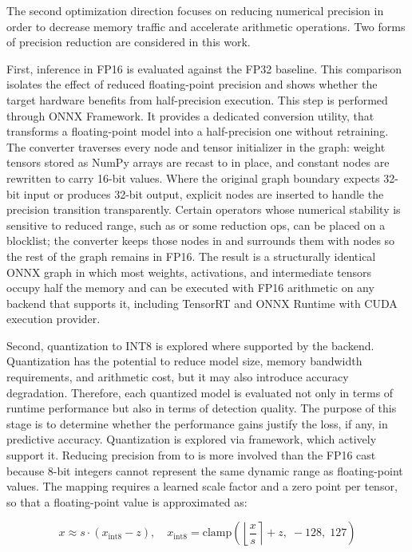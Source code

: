 \documentclass[12pt,a4paper]{report}
\begin{document}
The second optimization direction focuses on reducing numerical precision in order to decrease memory traffic and
accelerate arithmetic operations. Two forms of precision reduction are considered in this work.

First, inference in FP16 is evaluated against the FP32 baseline. This comparison isolates the effect of reduced
floating-point precision and shows whether the target hardware benefits from half-precision execution. This step is
performed through ONNX Framework. It provides a dedicated conversion utility, that transforms a floating-point model
into a half-precision one without retraining. The converter traverses every node and tensor initializer in the graph:
weight tensors stored as  NumPy arrays are recast to  in place, and constant nodes are
rewritten to carry 16-bit values. Where the original graph boundary expects 32-bit input or produces 32-bit output,
explicit  nodes are inserted to handle the precision transition transparently. Certain operators whose
numerical stability is sensitive to reduced range, such as  or some reduction ops, can be
placed on a blocklist; the converter keeps those nodes in  and surrounds them with  nodes
so the rest of the graph remains in FP16. The result is a structurally identical ONNX graph in which most weights,
activations, and intermediate tensors occupy half the memory and can be executed with FP16 arithmetic on any backend
that supports it, including TensorRT and ONNX Runtime with CUDA execution provider.

Second, quantization to INT8 is explored where supported by the backend. Quantization has the potential to reduce model
size, memory bandwidth requirements, and arithmetic cost, but it may also introduce accuracy degradation. Therefore,
each quantized model is evaluated not only in terms of runtime performance but also in terms of detection quality. The
purpose of this stage is to determine whether the performance gains justify the loss, if any, in predictive accuracy.
Quantization is explored via framework, which actively support it. Reducing precision from  to
 is more involved than the FP16 cast because 8-bit integers cannot represent the same dynamic range as
floating-point values. The mapping requires a learned scale factor and a zero point per tensor, so that
a floating-point value is approximated as:

\begin{equation}
    x \approx s \cdot (x_{\mathrm{int8}} - z), \quad x_{\mathrm{int8}} = \mathrm{clamp}\!\left(\left\lfloor \frac{x}{s}
    \right\rceil + z,\; -128,\; 127\right)
\end{equation}
\end{document}
